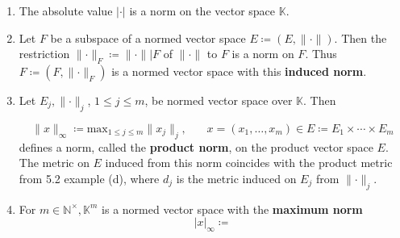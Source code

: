 \begin{eg}
    \begin{enumerate}[label=(\alph*)]
        \item The absolute value \(|\cdot|\) is a norm on the vector space \(\mathbb{K}\). 
        \item Let \(F\) be a subspace of a normed vector space 
        \(E \coloneqq \left(E, \lVert \cdot \rVert \right)\). Then the restriction 
        \(\lVert \cdot \rVert_F \coloneqq  \lVert \cdot \rVert | F\) of 
        \(\lVert \cdot \rVert\) to \(F\) is a norm on \(F\). Thus 
        \(F \coloneqq \left(F, \lVert \cdot \rVert_F\right)\) is a normed vector space 
        with this \textbf{induced norm}. 
        \item Let \(E_j, \lVert \cdot \rVert_j\), \(1 \leq j \leq m\), be normed vector 
        space over \(\mathbb{K}\). Then

        \[
            \lVert x \rVert_\infty \coloneqq \displaystyle{\text{max}_{1\leq j\leq m}}
            \lVert x_j \rVert_j, \:\:\:\:\:\:\:\: x = (x_1,\ldots,x_m) \in E \coloneqq
            E_1 \times \cdots \times E_m   
        \]
        defines a norm, called the \textbf{product norm}, on the product vector space 
        \(E\). The metric on \(E\) induced from this norm coincides with the product metric
        from 5.2 example (d), where \(d_j\) is the metric induced on \(E_j\) from 
        \(\lVert \cdot \rVert_j\). 
        \item For \(m \in \mathbb{N}^\times, \mathbb{K}^m \) is a normed vector space
        with the \textbf{maximum norm}
        \[
            |x|_\infty \coloneqq     
        \] 
    \end{enumerate}
\end{eg}



